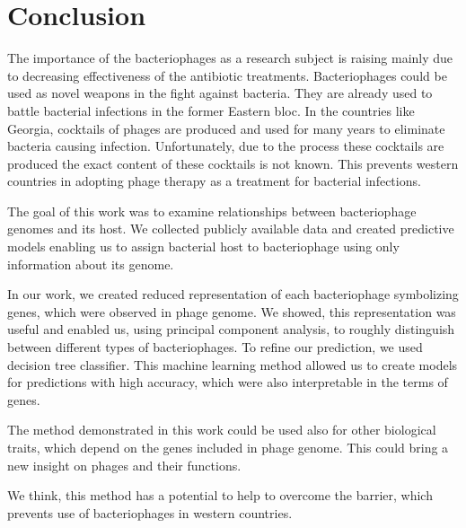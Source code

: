 \chapter*{Conclusion} %

The importance of the bacteriophages as a research subject is raising mainly due to decreasing effectiveness of the antibiotic treatments.
Bacteriophages could be used as novel weapons in the fight against bacteria.
They are already used to battle bacterial infections in the former Eastern bloc.
In the countries like Georgia, cocktails of phages are produced and used for many years to eliminate bacteria causing infection.
Unfortunately, due to the process these cocktails are produced the exact content of these cocktails is not known.
This prevents western countries in adopting phage therapy as a treatment for bacterial infections.

The goal of this work was to examine relationships between bacteriophage genomes and its host.
We collected publicly available data and created predictive models enabling us to assign bacterial host to bacteriophage using only information about its genome.

In our work, we created reduced representation of each bacteriophage symbolizing genes, which were observed in phage genome.
We showed, this representation was useful and enabled us, using principal component analysis, to roughly distinguish between different types of bacteriophages.
To refine our prediction, we used decision tree classifier.
This machine learning method allowed us to create models for predictions with high accuracy, which were also interpretable in the terms of genes.

The method demonstrated in this work could be used also for other biological traits, which depend on the genes included in phage genome.
This could bring a new insight on phages and their functions.

We think, this method has a potential to help to overcome the barrier, which prevents use of bacteriophages in western countries.

